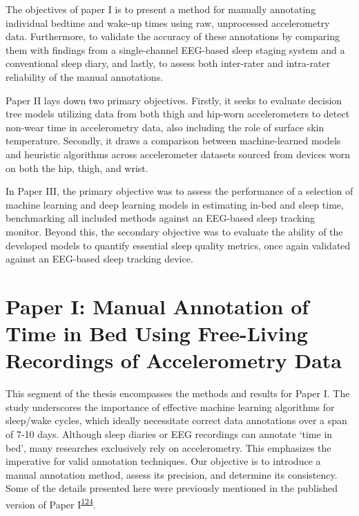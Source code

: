 \documentclass[
  10pt,
]{scrbook}
\begin{document}
The objectives of paper I is to present a method for manually annotating
individual bedtime and wake-up times using raw, unprocessed
accelerometry data. Furthermore, to validate the accuracy of these
annotations by comparing them with findings from a single-channel
EEG-based sleep staging system and a conventional sleep diary, and
lastly, to assess both inter-rater and intra-rater reliability of the
manual annotations.

Paper II lays down two primary objectives. Firstly, it seeks to evaluate
decision tree models utilizing data from both thigh and hip-worn
accelerometers to detect non-wear time in accelerometry data, also
including the role of surface skin temperature. Secondly, it draws a
comparison between machine-learned models and heuristic algorithms
across accelerometer datasets sourced from devices worn on both the hip,
thigh, and wrist.

In Paper III, the primary objective was to assess the performance of a
selection of machine learning and deep learning models in estimating
in-bed and sleep time, benchmarking all included methods against an
EEG-based sleep tracking monitor. Beyond this, the secondary objective
was to evaluate the ability of the developed models to quantify
essential sleep quality metrics, once again validated against an
EEG-based sleep tracking device.

\hypertarget{paper-i-manual-annotation-of-time-in-bed-using-free-living-recordings-of-accelerometry-data}{%
\chapter{Paper I: Manual Annotation of Time in Bed Using Free-Living
Recordings of Accelerometry
Data}\label{paper-i-manual-annotation-of-time-in-bed-using-free-living-recordings-of-accelerometry-data}}

This segment of the thesis encompasses the methods and results for Paper
I. The study underscores the importance of effective machine learning
algorithms for sleep/wake cycles, which ideally necessitate correct data
annotations over a span of 7-10 days. Although sleep diaries or EEG
recordings can annotate `time in bed', many researches exclusively rely
on accelerometry. This emphasizes the imperative for valid annotation
techniques. Our objective is to introduce a manual annotation method,
assess its precision, and determine its consistency. Some of the details
presented here were previously mentioned in the published version of
Paper
I\textsuperscript{\protect\hyperlink{ref-skovgaard_manual_2021}{124}}.
\end{document}
